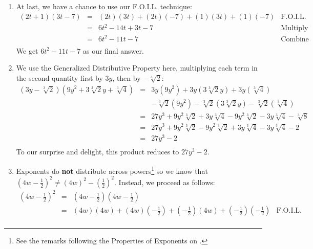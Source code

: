 \documentclass{ximera}
\begin{document}
\begin{example}
\begin{explanation}
\begin{enumerate}
\[\begin{array}{rclr}
\end{array}\] We get our final answer: $xz^2+ 3xz - 12z$.


\item  At last, we have a chance to use our F.O.I.L. technique:\[ \begin{array}{rclr}

(2t+1)(3t - 7) & = & (2t)(3t) + (2t)(-7) + (1)(3t) + (1)(-7) & \text{F.O.I.L.} \\
               & = & 6t^2 - 14t + 3t - 7 & \text{Multiply} \\
							 & = & 6t^2 - 11t - 7 & \text{Combine like terms} \\
							\end{array} \] We get $6t^2 - 11t - 7$ as our final answer.

\item  We use the Generalized Distributive Property here, multiplying each term in the second quantity first by $3y$, then by $-\sqrt[3]{2}$:\[ \begin{array}{rclr}

\left(3y - \sqrt[3]{2}\right)\left(9y^2 + 3\sqrt[3]{2} y + \sqrt[3]{4}\right) & = & 3y\left(9y^2\right) +3y\left(3\sqrt[3]{2} y\right) + 3y\left(\sqrt[3]{4}\right) & \\
       & & -\sqrt[3]{2} \left(9y^2\right) - \sqrt[3]{2} \left(3\sqrt[3]{2} y\right) -\sqrt[3]{2} \left(\sqrt[3]{4}\right) & \\
			  & = & 27y^3 + 9y^2 \sqrt[3]{2} + 3y \sqrt[3]{4} - 9y^2\sqrt[3]{2} - 3y \sqrt[3]{4} - \sqrt[3]{8} & \\
				& = & 27y^3 + 9y^2 \sqrt[3]{2} - 9y^2 \sqrt[3]{2} + 3y \sqrt[3]{4} - 3y \sqrt[3]{4} - 2 & \\
				& = & 27y^3 - 2 \\ 

\end{array} \] To our surprise and delight, this product reduces to $27y^3 - 2$.

\item Exponents do \textbf{not} distribute across powers\footnote{See the remarks following the Properties of Exponents on \pageref{propertiesofintegerexponents}.} so we know that  $\left(4w - \frac{1}{2} \right)^2 \neq (4w)^2 - \left(\frac{1}{2}\right)^2$.  Instead, we proceed as follows:\[ \begin{array}{rclr}

\left(4w -  \frac{1}{2} \right)^2 & = & \left(4w -  \frac{1}{2} \right)\left(4w -  \frac{1}{2} \right) &   \\ 
& = & (4w)(4w) + (4w)\left(- \frac{1}{2}\right) + \left(- \frac{1}{2}\right)(4w) + \left(- \frac{1}{2}\right)\left(- \frac{1}{2}\right) &   \text{F.O.I.L.} \\ 
		

\end{array}\]
\end{enumerate}
\end{explanation}
\end{example}
\end{document}
